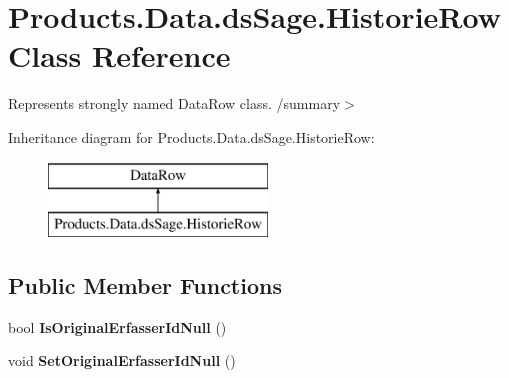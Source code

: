 \hypertarget{class_products_1_1_data_1_1ds_sage_1_1_historie_row}{}\section{Products.\+Data.\+ds\+Sage.\+Historie\+Row Class Reference}
\label{class_products_1_1_data_1_1ds_sage_1_1_historie_row}


Represents strongly named Data\+Row class. /summary$>$  


Inheritance diagram for Products.\+Data.\+ds\+Sage.\+Historie\+Row\+:\begin{figure}[H]
\begin{center}
\leavevmode
\includegraphics[height=2.000000cm]{class_products_1_1_data_1_1ds_sage_1_1_historie_row}
\end{center}
\end{figure}
\subsection*{Public Member Functions}
\begin{DoxyCompactItemize}
\item 
bool {\bfseries Is\+Original\+Erfasser\+Id\+Null} ()\hypertarget{class_products_1_1_data_1_1ds_sage_1_1_historie_row_aaf028c2ff827656025d3269830abda33}{}\label{class_products_1_1_data_1_1ds_sage_1_1_historie_row_aaf028c2ff827656025d3269830abda33}

\item 
void {\bfseries Set\+Original\+Erfasser\+Id\+Null} ()\hypertarget{class_products_1_1_data_1_1ds_sage_1_1_historie_row_abb3005a4e80f0c849487feb8bfb877fd}{}\label{class_products_1_1_data_1_1ds_sage_1_1_historie_row_abb3005a4e80f0c849487feb8bfb877fd}

\end{DoxyCompactItemize}
